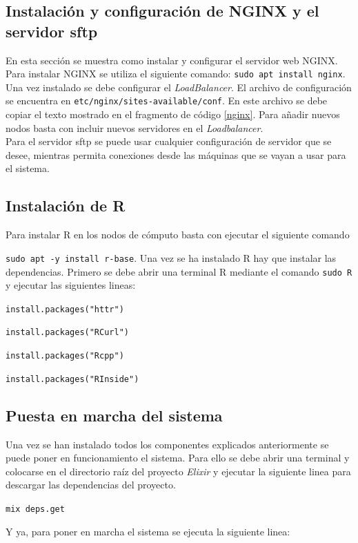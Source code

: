 \subsection{Instalación y configuración de NGINX y el servidor sftp}
En esta sección se muestra como instalar y configurar el servidor web NGINX. 
Para instalar NGINX se utiliza el siguiente comando: \texttt{sudo apt install nginx}. Una vez instalado se debe configurar el \textit{LoadBalancer}. El archivo de configuración se encuentra en \texttt{etc/nginx/sites-available/conf}. En este archivo se debe copiar el texto mostrado en el fragmento de código \ref{nginx}. Para añadir nuevos nodos basta con incluir nuevos servidores en el \textit{Loadbalancer}.
\\
Para el servidor sftp se puede usar cualquier configuración de servidor que se desee, mientras permita conexiones desde las máquinas que se vayan a usar para el sistema.
\subsection{Instalación de R}
Para instalar R en los nodos de cómputo basta con ejecutar el siguiente comando 

\texttt{sudo apt -y install r-base}. Una vez se ha instalado R hay que instalar las dependencias. Primero se debe abrir una terminal R mediante el comando \texttt{sudo R} y ejecutar las siguientes lineas:

\texttt{install.packages("httr")}

\texttt{install.packages("RCurl")}

\texttt{install.packages("Rcpp")}

\texttt{install.packages("RInside")}

\subsection{Puesta en marcha del sistema}
Una vez se han instalado todos los componentes explicados anteriormente se puede poner en funcionamiento el sistema. Para ello se debe abrir una terminal y colocarse en el directorio raíz del proyecto \textit{Elixir} y ejecutar la siguiente linea para descargar las dependencias del proyecto.

\texttt{mix deps.get}

Y ya, para poner en marcha el sistema se ejecuta la siguiente linea:


